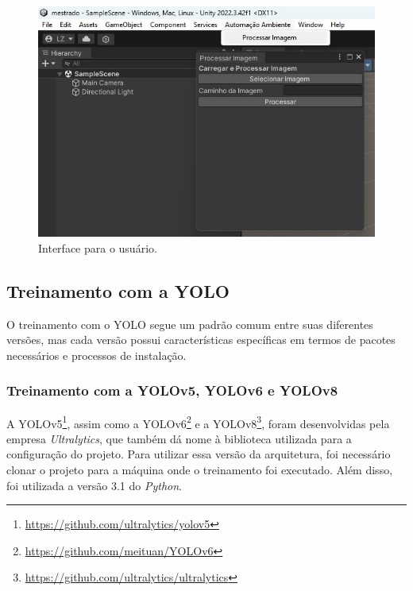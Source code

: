 \begin{figure}[!h]
    \centering
    \begin{minipage}{0.7\linewidth}
        \centering
        \captionsetup{justification=centering,margin=0.5cm,font=small}
        \includegraphics[width=\linewidth]{img/cap5/GUI-TOOL.jpeg}
        \caption{Interface para o usuário.}
        \label{fig:GUI}
    \end{minipage}
\end{figure}

\subsection{Treinamento com a YOLO}

O treinamento com o YOLO segue um padrão comum entre suas diferentes versões, mas cada versão possui características específicas em termos de pacotes necessários e processos de instalação. 

\subsubsection{Treinamento com a YOLOv5, YOLOv6 e YOLOv8}

A YOLOv5\footnote{\url{https://github.com/ultralytics/yolov5}}, assim como a YOLOv6\footnote{\url{https://github.com/meituan/YOLOv6}} e a YOLOv8\footnote{\url{https://github.com/ultralytics/ultralytics}}, foram desenvolvidas pela empresa \textit{Ultralytics}, que também dá nome à biblioteca utilizada para a configuração do projeto. Para utilizar essa versão da arquitetura, foi necessário clonar o projeto para a máquina onde o treinamento foi executado. Além disso, foi utilizada a versão 3.1 do \textit{Python}.

